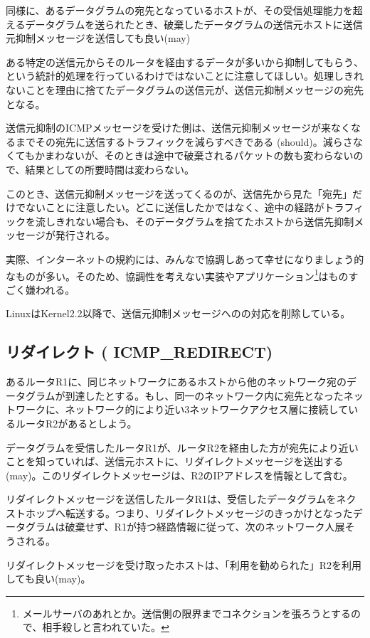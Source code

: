 同様に、あるデータグラムの宛先となっているホストが、その受信処理能力を超えるデータグラムを送られたとき、破棄したデータグラムの送信元ホストに送信元抑制メッセージを送信しても良い(may)

ある特定の送信元からそのルータを経由するデータが多いから抑制してもらう、という統計的処理を行っているわけではないことに注意してほしい。処理しきれないことを理由に捨てたデータグラムの送信元が、送信元抑制メッセージの宛先となる。

送信元抑制のICMPメッセージを受けた側は、送信元抑制メッセージが来なくなるまでその宛先に送信するトラフィックを減らすべきである (should)。減らさなくてもかまわないが、そのときは途中で破棄されるパケットの数も変わらないので、結果としての所要時間は変わらない。

このとき、送信元抑制メッセージを送ってくるのが、送信先から見た「宛先」だけでないことに注意したい。どこに送信したかではなく、途中の経路がトラフィックを流しきれない場合も、そのデータグラムを捨てたホストから送信先抑制メッセージが発行される。

実際、インターネットの規約には、みんなで協調しあって幸せになりましょう的なものが多い。そのため、協調性を考えない実装やアプリケーション\footnote{メールサーバのあれとか。送信側の限界までコネクションを張ろうとするので、相手殺しと言われていた。}はものすごく嫌われる。

LinuxはKernel2.2以降で、送信元抑制メッセージへのの対応を削除している。

\subsection{リダイレクト ( ICMP\_REDIRECT)}

あるルータR1に、同じネットワークにあるホストから他のネットワーク宛のデータグラムが到達したとする。もし、同一のネットワーク内に宛先となったネットワークに、ネットワーク的により近い3ネットワークアクセス層に接続しているルータR2があるとしよう。

データグラムを受信したルータR1が、ルータR2を経由した方が宛先により近いことを知っていれば、送信元ホストに、リダイレクトメッセージを送出する(may)。このリダイレクトメッセージは、R2のIPアドレスを情報として含む。

リダイレクトメッセージを送信したルータR1は、受信したデータグラムをネクストホップへ転送する。つまり、リダイレクトメッセージのきっかけとなったデータグラムは破棄せず、R1が持つ経路情報に従って、次のネットワーク人展そうされる。

リダイレクトメッセージを受け取ったホストは、「利用を勧められた」R2を利用しても良い(may)。

